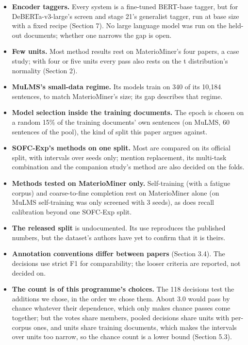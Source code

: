 \documentclass[11pt,a4paper]{article}
\providecommand{\tightlist}{\setlength{\itemsep}{0pt}\setlength{\parskip}{0pt}}
\begin{document}
\begin{itemize}
\tightlist
\item
  \textbf{Encoder taggers.} Every system is a fine-tuned BERT-base tagger, but
  for DeBERTa-v3-large's screen and stage 21's generalist tagger, run at
  base size with a fixed recipe (Section 7). No large language model was
  run on the held-out documents; whether one narrows the gap is open.
\item
  \textbf{Few units.} Most method results rest on MaterioMiner's four papers, a
  case study; with four or five units every pass also rests on the t
  distribution's normality (Section 2).
\item
  \textbf{MuLMS's small-data regime.} Its models train on 340 of its 10,184
  sentences, to match MaterioMiner's size; its gap describes that regime.
\item
  \textbf{Model selection inside the training documents.} The epoch is chosen
  on a random 15\% of the training documents' own sentences (on MuLMS, 60
  sentences of the pool), the kind of split this paper argues against.
\item
  \textbf{SOFC-Exp's methods on one split.} Most are compared on its official
  split, with intervals over seeds only; mention replacement, its
  multi-task combination and the companion study's method are also decided
  on the folds.
\item
  \textbf{Methods tested on MaterioMiner only.} Self-training (with a fatigue
  corpus) and coarse-to-fine completion rest on MaterioMiner alone (on
  MuLMS self-training was only screened with 3 seeds), as does recall
  calibration beyond one SOFC-Exp split.
\item
  \textbf{The released split} is undocumented. Its use reproduces the published
  numbers, but the dataset's authors have yet to confirm that it is
  theirs.
\item
  \textbf{Annotation conventions differ between papers} (Section 3.4). The
  decisions use strict F1 for comparability; the looser criteria are
  reported, not decided on.
\item
  \textbf{The count is of this programme's choices.} The 118 decisions test the
  additions we chose, in the order we chose them. About 3.0 would pass by
  chance whatever their dependence, which only makes chance passes come
  together; but the votes share members, pooled decisions share units with
  per-corpus ones, and units share training documents, which makes the
  intervals over units too narrow, so the chance count is a lower bound
  (Section 5.3).
\end{itemize}
\end{document}
